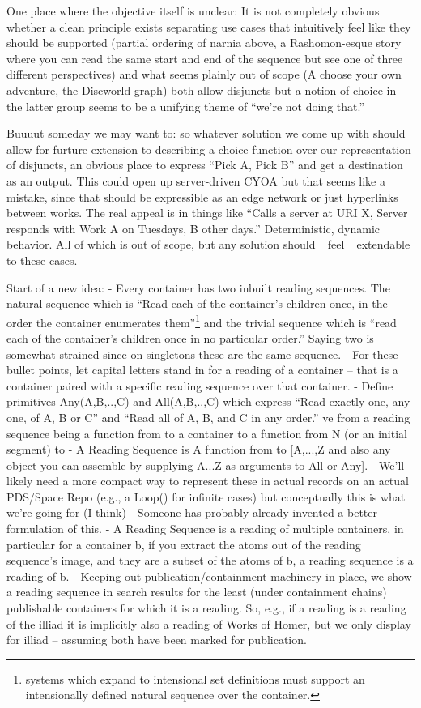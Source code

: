 One place where the objective itself is unclear: 
It is not completely obvious whether a clean principle exists separating use cases that intuitively feel like they should be supported (partial ordering of narnia above, a Rashomon-esque story where you can read the same start and end of the sequence but see one of three different perspectives) and what seems plainly out of scope (A choose your own adventure, the Discworld graph) both allow disjuncts but a notion of choice in the latter group seems to be a unifying theme of ``we're not doing that.''

Buuuut someday we may want to: so whatever solution we come up with should allow for furture extension to describing a choice function over our representation of disjuncts, an obvious place to express ``Pick A, Pick B'' and get a destination as an output. This could open up server-driven CYOA but that seems like a mistake, since that should be expressible as an edge network or just hyperlinks between works. The real appeal is in things like ``Calls a server at URI X, Server responds with Work A on Tuesdays, B other days.'' Deterministic, dynamic behavior. All of which is out of scope, but any solution should _feel_ extendable to these cases.  

Start of a new idea:
- Every container has two inbuilt reading sequences. The natural sequence which is ``Read each of the container's children once, in the order the container enumerates them''\footnote{systems which expand to intensional set definitions must support an intensionally defined natural sequence over the container.} and the trivial sequence which is ``read each of the container's children once in no particular order.'' Saying two is somewhat strained since on singletons these are the same sequence.
- For these bullet points, let capital letters stand in for a reading of a container -- that is a container paired with a specific reading sequence over that container. 
- Define primitives Any(A,B,..,C) and All(A,B,..,C) which express ``Read exactly one, any one, of A, B or C'' and ``Read all of A, B, and C in any order.'' ve from a reading sequence being a function from  to a container to a function from N (or an initial segment) to 
- A Reading Sequence is A function from  to [{A,...,Z} and also any object you can assemble by supplying A...Z as arguments to All or Any].
- We'll likely need a more compact way to represent these in actual records on an actual PDS/Space Repo (e.g., a Loop() for infinite cases) but conceptually this is what we're going for (I think)
- Someone has probably already invented a better formulation of this.
- A Reading Sequence is a reading of multiple containers, in particular for a container b, if you extract the atoms out of the reading sequence's image, and they are a subset of the atoms of b, a reading sequence is a reading of b.
- Keeping out publication/containment machinery in place, we show a reading sequence in search results for the least (under containment chains) publishable containers for which it is a reading. So, e.g., if a reading is a reading of the illiad it is implicitly also a reading of Works of Homer, but we only display for illiad -- assuming both have been marked for publication.

